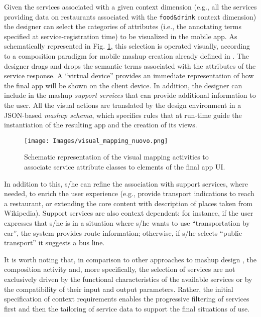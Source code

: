 Given the services associated with a given context dimension (e.g., all the services providing data on restaurants associated with the \texttt{food\&drink} context dimension) the designer can select the categories of attributes (i.e., the annotating terms specified at service-registration time) to be visualized in the mobile app. As schematically represented in Fig. \ref{fig:visualMapping}, this selection is operated visually, according to a composition paradigm for mobile mashup creation already defined in \cite{journals/TWEB2015/CappielloMP15}. The designer drags and drops the semantic terms associated with the attributes of the service
response.    A ``virtual device'' provides an immediate representation of how the final app will be shown on the client device. 
In addition, the designer can include in the mashup \emph{support
services} that can provide additional information to the user. All the visual actions are translated by the design environment in a JSON-based \emph{mashup schema}, which specifies rules that at run-time guide the instantiation of the resulting app and the creation of its views.

%
\begin{figure} [t]
\centering
\texttt{[image: Images/visual\_mapping\_nuovo.png]}
\caption{Schematic representation of the visual mapping activities to associate service attribute classes to elements of the final app UI.}
\label{fig:visualMapping}
\end{figure}
%


In addition to this, s/he can refine the association with support services,
where needed, to enrich the user experience (e.g., provide transport
indications to reach a restaurant, or extending the core content with description of places taken from Wikipedia). Support services are also context dependent:
for instance, if the user expresses that s/he is in a situation where s/he wants to use ``transportation by car'', the system provides route information; otherwise, if s/he selects ``public transport'' it suggests
a bus line.

It is worth noting that, in comparison to other approaches to mashup
design \cite{DBLP:books/sp/DanielM14}, the composition activity and,
more specifically, the selection of services are not exclusively driven
by the functional characteristics of the available services or by the
compatibility of their input and output parameters. Rather, the
initial specification of context requirements enables the progressive
filtering of services first and then the tailoring of service data to
support the final situations of use.

